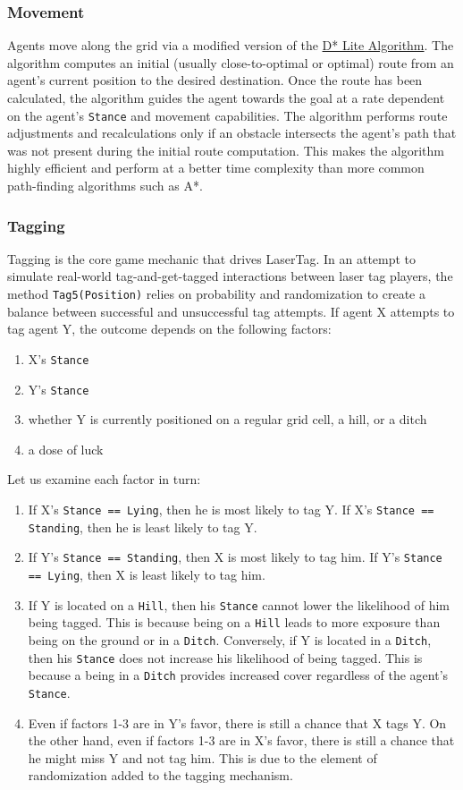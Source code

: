 \documentclass[
  a4paper,
  english,
  DIV=16,
  11pt,
  parskip=half,
  dvipsnames,
  listof=totoc,		     %
  index=totoc,		     %
  bibliography=totoc,	 %
]{scrartcl}
\begin{document}
\subsubsection{Movement} \label{sssec:movement}
Agents move along the grid via a modified version of the \href{http://idm-lab.org/bib/abstracts/papers/aaai02b.pdf}{D* Lite Algorithm}. The algorithm computes an initial (usually close-to-optimal or optimal) route from an agent's current position to the desired destination. Once the route has been calculated, the algorithm guides the agent towards the goal at a rate dependent on the agent's \texttt{Stance} and movement capabilities. The algorithm performs route adjustments and recalculations only if an obstacle intersects the agent's path that was not present during the initial route computation. This makes the algorithm highly efficient and perform at a better time complexity than more common path-finding algorithms such as A*.
%
\subsubsection{Tagging} \label{sssec:tagging}
Tagging is the core game mechanic that drives LaserTag. In an attempt to simulate real-world tag-and-get-tagged interactions between laser tag players, the method \texttt{Tag5(Position)} relies on probability and randomization to create a balance between successful and unsuccessful tag attempts. If agent X attempts to tag agent Y, the outcome depends on the following factors:
%
\begin{enumerate}
  \item X's \texttt{Stance}
  \item Y's \texttt{Stance}
  \item whether Y is currently positioned on a regular grid cell, a hill, or a ditch
  \item a dose of luck
\end{enumerate}
%
Let us examine each factor in turn:
%
\begin{enumerate}
  \item If X's \texttt{Stance == Lying}, then he is most likely to tag Y. If X's \texttt{Stance == Standing}, then he is least likely to tag Y.
  \item If Y's \texttt{Stance == Standing}, then X is most likely to tag him. If Y's \texttt{Stance == Lying}, then X is least likely to tag him.
  \item If Y is located on a \texttt{Hill}, then his \texttt{Stance} cannot lower the likelihood of him being tagged. This is because being on a \texttt{Hill} leads to more exposure than being on the ground or in a \texttt{Ditch}. Conversely, if Y is located in a \texttt{Ditch}, then his \texttt{Stance} does not increase his likelihood of being tagged. This is because a being in a \texttt{Ditch} provides increased cover regardless of the agent's \texttt{Stance}.
  \item Even if factors 1-3 are in Y's favor, there is still a chance that X tags Y. On the other hand, even if factors 1-3 are in X's favor, there is still a chance that he might miss Y and not tag him. This is due to the element of randomization added to the tagging mechanism.
\end{enumerate}
%
\end{document}

